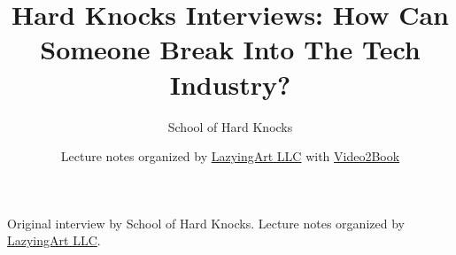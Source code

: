\documentclass[11pt,oneside]{book}
\begin{document}
\frontmatter
\title{Hard Knocks Interviews: How Can Someone Break Into The Tech Industry?}
\author{School of Hard Knocks}
\date{Lecture notes organized by \href{https://lazying.art}{LazyingArt LLC} with \href{https://github.com/lachlanchen/Video2Book}{Video2Book}}
\maketitle
\begin{center}
\small Original interview by School of Hard Knocks. Lecture notes organized by \href{https://lazying.art}{LazyingArt LLC}.
\end{center}
\clearpage
\mainmatter

\end{document}

